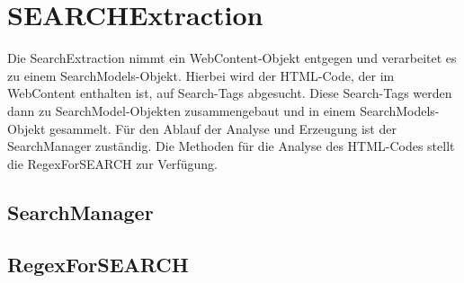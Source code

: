 
\section{SEARCHExtraction}
Die SearchExtraction nimmt ein WebContent-Objekt entgegen und verarbeitet es zu einem SearchModels-Objekt. Hierbei wird der HTML-Code, der im WebContent enthalten ist, auf Search-Tags abgesucht. Diese Search-Tags werden dann zu SearchModel-Objekten zusammengebaut und in einem SearchModels-Objekt gesammelt.\newline
Für den Ablauf der Analyse und Erzeugung ist der SearchManager zuständig. Die Methoden für die Analyse des HTML-Codes stellt die RegexForSEARCH zur Verfügung.
\subsection{SearchManager}
\subsection{RegexForSEARCH}

